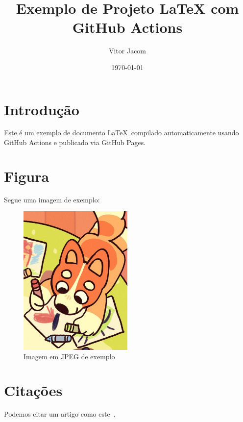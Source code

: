 \documentclass[12pt]{article}
\title{Exemplo de Projeto LaTeX com GitHub Actions}
\author{Vitor Jacom}
\date{\today}
\begin{document}
\maketitle

\section{Introdução}
Este é um exemplo de documento \LaTeX~compilado automaticamente usando GitHub Actions e publicado via GitHub Pages.

\section{Figura}
Segue uma imagem de exemplo:

\begin{figure}[h!]
\centering
\includegraphics[width=0.5\textwidth]{figures/default.jpg}
\caption{Imagem em JPEG de exemplo}
\end{figure}

\section{Citações}
Podemos citar um artigo como este~\cite{knuth1984texbook}.

\printbibliography
\end{document}

